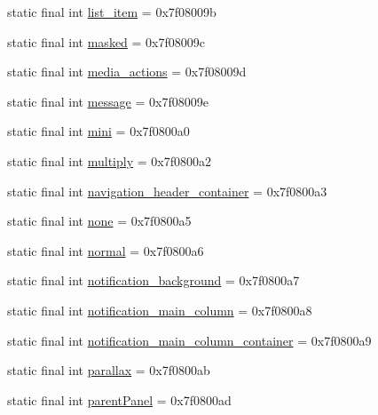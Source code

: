 \begin{DoxyCompactItemize}
\item 
static final int \mbox{\hyperlink{classandroid_1_1support_1_1design_1_1_r_1_1id_aeeec2bcf1f8afaf2c5f7a49c7563a3a0}{list\+\_\+item}} = 0x7f08009b
\item 
static final int \mbox{\hyperlink{classandroid_1_1support_1_1design_1_1_r_1_1id_afc81163bf733b0dbd07b3b42bbd7c787}{masked}} = 0x7f08009c
\item 
static final int \mbox{\hyperlink{classandroid_1_1support_1_1design_1_1_r_1_1id_aed56f430ded713604804f6ef2e52001f}{media\+\_\+actions}} = 0x7f08009d
\item 
static final int \mbox{\hyperlink{classandroid_1_1support_1_1design_1_1_r_1_1id_ab58c404e690499850326c54532b67d90}{message}} = 0x7f08009e
\item 
static final int \mbox{\hyperlink{classandroid_1_1support_1_1design_1_1_r_1_1id_a88811cbf51e1d607ab0468ba99937bd6}{mini}} = 0x7f0800a0
\item 
static final int \mbox{\hyperlink{classandroid_1_1support_1_1design_1_1_r_1_1id_a134f5f17353ed21214390ab7ea4dff8b}{multiply}} = 0x7f0800a2
\item 
static final int \mbox{\hyperlink{classandroid_1_1support_1_1design_1_1_r_1_1id_a4ba0611713d8d7328f336a8220b88f33}{navigation\+\_\+header\+\_\+container}} = 0x7f0800a3
\item 
static final int \mbox{\hyperlink{classandroid_1_1support_1_1design_1_1_r_1_1id_a9408d8d9326a8268cca9848a4f0c4264}{none}} = 0x7f0800a5
\item 
static final int \mbox{\hyperlink{classandroid_1_1support_1_1design_1_1_r_1_1id_a075ec293abae4b6570743febf3eb6b3e}{normal}} = 0x7f0800a6
\item 
static final int \mbox{\hyperlink{classandroid_1_1support_1_1design_1_1_r_1_1id_aac8da5dddb77215b07e2bc84bd1b22d2}{notification\+\_\+background}} = 0x7f0800a7
\item 
static final int \mbox{\hyperlink{classandroid_1_1support_1_1design_1_1_r_1_1id_a7c01e843bd2f6524e2c4d59abda44b3f}{notification\+\_\+main\+\_\+column}} = 0x7f0800a8
\item 
static final int \mbox{\hyperlink{classandroid_1_1support_1_1design_1_1_r_1_1id_aeb6b68e9fe2941575be7ed8a5e43b858}{notification\+\_\+main\+\_\+column\+\_\+container}} = 0x7f0800a9
\item 
static final int \mbox{\hyperlink{classandroid_1_1support_1_1design_1_1_r_1_1id_a9188f01eb52456eb2965c39dc691e444}{parallax}} = 0x7f0800ab
\item 
static final int \mbox{\hyperlink{classandroid_1_1support_1_1design_1_1_r_1_1id_a298108f25bd760f5b125688096d0de14}{parent\+Panel}} = 0x7f0800ad

\end{DoxyCompactItemize}
